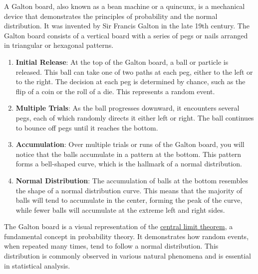 \documentclass[
  a4paper,
]{scrbook}
\begin{document}
A Galton board, also known as a bean machine or a quincunx, is a
mechanical device that demonstrates the principles of probability and
the normal distribution. It was invented by Sir Francis Galton in the
late 19th century. The Galton board consists of a vertical board with a
series of pegs or nails arranged in triangular or hexagonal patterns.

\begin{enumerate}
\def\labelenumi{\arabic{enumi}.}
\item
  \textbf{Initial Release}: At the top of the Galton board, a ball or
  particle is released. This ball can take one of two paths at each peg,
  either to the left or to the right. The decision at each peg is
  determined by chance, such as the flip of a coin or the roll of a die.
  This represents a random event.
\item
  \textbf{Multiple Trials}: As the ball progresses downward, it
  encounters several pegs, each of which randomly directs it either left
  or right. The ball continues to bounce off pegs until it reaches the
  bottom.
\item
  \textbf{Accumulation}: Over multiple trials or runs of the Galton
  board, you will notice that the balls accumulate in a pattern at the
  bottom. This pattern forms a bell-shaped curve, which is the hallmark
  of a normal distribution.
\item
  \textbf{Normal Distribution}: The accumulation of balls at the bottom
  resembles the shape of a normal distribution curve. This means that
  the majority of balls will tend to accumulate in the center, forming
  the peak of the curve, while fewer balls will accumulate at the
  extreme left and right sides.
\end{enumerate}

The Galton board is a visual representation of the
\hyperref[clt]{central limit theorem}, a fundamental concept in
probability theory. It demonstrates how random events, when repeated
many times, tend to follow a normal distribution. This distribution is
commonly observed in various natural phenomena and is essential in
statistical analysis.
\end{document}
